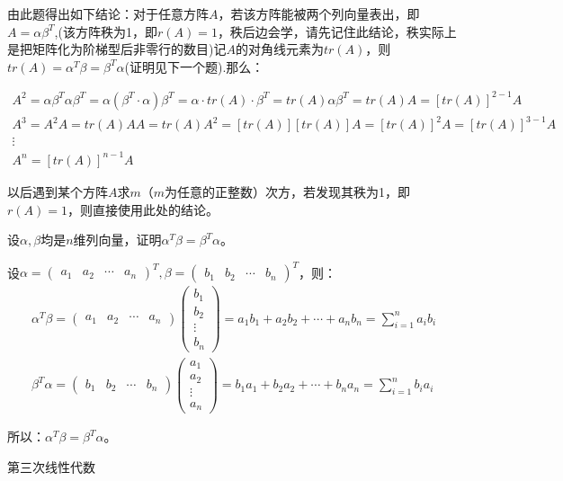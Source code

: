 \documentclass[a4paper]{report}
\begin{document}
\begin{tips}
由此题得出如下结论：对于任意方阵$A$，若该方阵能被两个列向量表出，即$A=\alpha\beta^T$,(该方阵秩为1，即$r(A)=1$，秩后边会学，请先记住此结论，秩实际上是把矩阵化为阶梯型后非零行的数目)记$A$的对角线元素为$tr(A)$，则$tr(A)=\alpha^T\beta=\beta^T\alpha$(证明见下一个题).那么：

\begin{gather*}
A^2=\alpha\beta^T\alpha\beta^T=\alpha(\beta^T\cdot\alpha)\beta^T=\alpha\cdot tr(A)\cdot\beta^T=tr(A)\alpha\beta^T=tr(A)A=[tr(A)]^{2-1}A\\
A^3=A^2A=tr(A)AA=tr(A)A^2=[tr(A)][tr(A)]A=[tr(A)]^2A=[tr(A)]^{3-1}A\\
\vdots\\
A^n=[tr(A)]^{n-1}A
\end{gather*}

以后遇到某个方阵$A$求$m$（$m$为任意的正整数）次方，若发现其秩为1，即$r(A)=1$，则直接使用此处的结论。
\end{tips}

\EX 设$\alpha,\beta$均是$n$维列向量，证明$\alpha^T\beta=\beta^T\alpha$。

\begin{zhengming}
设$\alpha=
\begin{pmatrix}
a_1&a_2&\cdots&a_n
\end{pmatrix}^T
,\beta=
\begin{pmatrix}
b_1&b_2&\cdots&b_n
\end{pmatrix}^T$，则：
\begin{gather*}
\alpha^T\beta=\begin{pmatrix}
a_1&a_2&\cdots&a_n
\end{pmatrix}\begin{pmatrix}
b_1\\ b_2\\ \vdots\\ b_n
\end{pmatrix}=a_1b_1+a_2b_2+\cdots+a_nb_n=\sum_{i=1}^{n}a_{i}b_{i}\\
\beta^T\alpha=\begin{pmatrix}
b_1&b_2&\cdots&b_n
\end{pmatrix}\begin{pmatrix}
a_1\\ a_2\\ \vdots\\ a_n
\end{pmatrix}=b_1a_1+b_2a_2+\cdots+b_na_n=\sum_{i=1}^{n}b_ia_i
\end{gather*}

所以：$\alpha^T\beta=\beta^T\alpha$。
\end{zhengming}
\clearpage
\hphantom{~~}\hfill {\heiti 第三次线性代数} \hfill\hphantom{~~}
\setcounter{Emp}{14}
\end{document}
